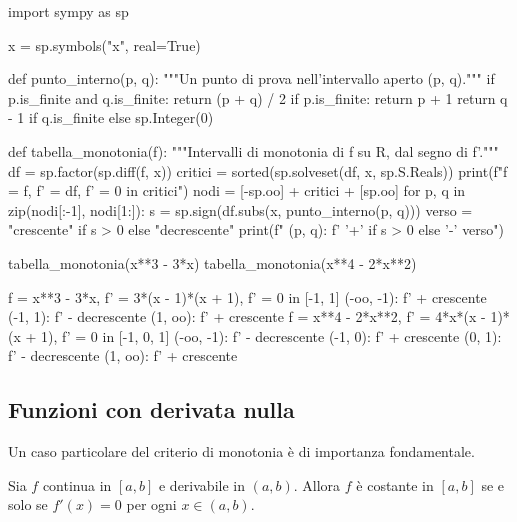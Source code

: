 \begin{python}
import sympy as sp

x = sp.symbols("x", real=True)

def punto_interno(p, q):
    """Un punto di prova nell'intervallo aperto (p, q)."""
    if p.is_finite and q.is_finite:
        return (p + q) / 2
    if p.is_finite:
        return p + 1
    return q - 1 if q.is_finite else sp.Integer(0)

def tabella_monotonia(f):
    """Intervalli di monotonia di f su R, dal segno di f'."""
    df = sp.factor(sp.diff(f, x))
    critici = sorted(sp.solveset(df, x, sp.S.Reals))
    print(f"f = {f},   f' = {df},   f' = 0 in {critici}")
    nodi = [-sp.oo] + critici + [sp.oo]
    for p, q in zip(nodi[:-1], nodi[1:]):
        s = sp.sign(df.subs(x, punto_interno(p, q)))
        verso = "crescente" if s > 0 else "decrescente"
        print(f"  ({p}, {q}):  f' {'+' if s > 0 else '-'}  {verso}")

tabella_monotonia(x**3 - 3*x)
tabella_monotonia(x**4 - 2*x**2)
\end{python}
\begin{risultato}
f = x**3 - 3*x,   f' = 3*(x - 1)*(x + 1),   f' = 0 in [-1, 1]
  (-oo, -1):  f' +  crescente
  (-1, 1):  f' -  decrescente
  (1, oo):  f' +  crescente
f = x**4 - 2*x**2,   f' = 4*x*(x - 1)*(x + 1),   f' = 0 in [-1, 0, 1]
  (-oo, -1):  f' -  decrescente
  (-1, 0):  f' +  crescente
  (0, 1):  f' -  decrescente
  (1, oo):  f' +  crescente
\end{risultato}

\subsection{Funzioni con derivata nulla}

Un caso particolare del criterio di monotonia è di importanza fondamentale.

\begin{corollario}\label{cor:funzioni-costanti}
Sia $f$ continua in $[a,b]$ e derivabile in $(a,b)$. Allora $f$ è costante in $[a,b]$
se e solo se $f'(x)=0$ per ogni $x\in(a,b)$.
\end{corollario}

\begin{schema}
\end{schema}

